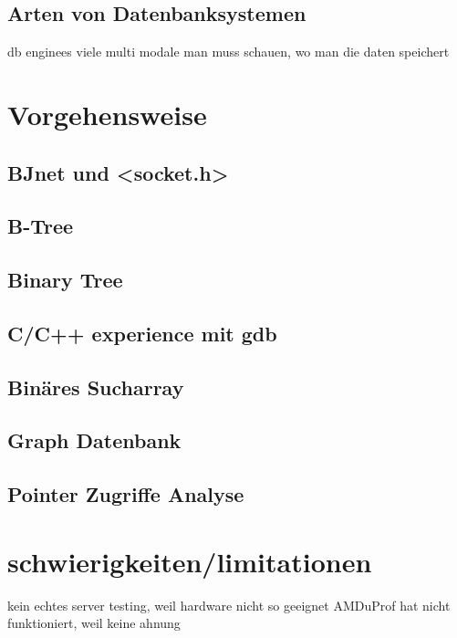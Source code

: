 \documentclass[11pt,a4paper]{article}
\begin{document}
\subsection{Arten von Datenbanksystemen}

db enginees
viele multi modale
man muss schauen, wo man die daten speichert

\section{Vorgehensweise}

\subsection{BJnet und <socket.h>}
\subsection{B-Tree}

\subsection{Binary Tree}

\subsection{C/C++ experience mit gdb}

\subsection{Binäres Sucharray}
\subsection{Graph Datenbank}

\subsection{Pointer Zugriffe Analyse}

\section{schwierigkeiten/limitationen}

kein echtes server testing, weil hardware nicht so geeignet
AMDuProf hat nicht funktioniert, weil keine ahnung
\end{document}
